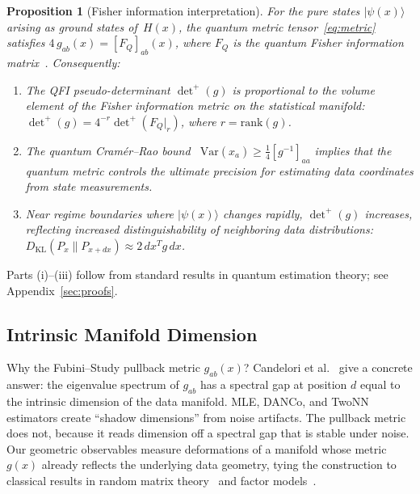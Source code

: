 \documentclass[3p]{elsarticle}
\newtheorem{proposition}[theorem]{Proposition}
\newcommand{\ket}[1]{|#1\rangle}
\begin{document}
\begin{proposition}[Fisher information interpretation]%
\label{prop:fisher}
For the pure states $\ket{\psi(x)}$ arising as ground states
of~$H(x)$, the quantum metric
tensor~\eqref{eq:metric} satisfies
$4\,g_{ab}(x) = [F_Q]_{ab}(x)$, where $F_Q$ is the quantum Fisher
information matrix~\cite{braunstein_caves1994,pezze2018,toth2014}.  Consequently:
\begin{enumerate}
\item[(i)] The QFI pseudo-determinant
  $\det^+(g)$ is proportional to the volume element of
  the Fisher information metric on the statistical manifold:
  $\det^+(g) = 4^{-r}\det^+(F_Q|_r)$, where $r = \mathrm{rank}(g)$.
\item[(ii)] The quantum Cram\'{e}r--Rao bound~\cite{cramer1946,helstrom1976}
  $\mathrm{Var}(\hat{x}_a) \geq \tfrac{1}{4}[g^{-1}]_{aa}$
  implies that the quantum metric controls the ultimate precision
  for estimating data coordinates from state
  measurements.
\item[(iii)] Near regime boundaries where $\ket{\psi(x)}$ changes
  rapidly, $\det^+(g)$ increases, reflecting increased
  distinguishability of neighboring data distributions:
  $D_{\mathrm{KL}}(P_x \| P_{x+dx}) \approx 2\,dx^T g\,dx$.
\end{enumerate}
\end{proposition}
\noindent Parts (i)--(iii) follow from standard results in quantum
estimation theory; see Appendix~\ref{sec:proofs}.

\subsection{Intrinsic Manifold Dimension}\label{subsec:intrinsic_dim}

Why the Fubini--Study pullback metric $g_{ab}(x)$?  Candelori et
al.~\cite{candelori2025} give a concrete answer: the eigenvalue
spectrum of $g_{ab}$ has a spectral gap at position $d$ equal to the
intrinsic dimension of the data manifold.  MLE, DANCo, and TwoNN
estimators create ``shadow dimensions'' from noise artifacts.  The
pullback metric does not, because it reads dimension off a spectral
gap that is stable under noise.  Our geometric observables measure
deformations of a manifold whose metric $g(x)$ already reflects the
underlying data geometry, tying the construction to classical results
in random matrix theory~\cite{laloux1999,laloux2000} and factor
models~\cite{bai_ng2002}.
\end{document}

